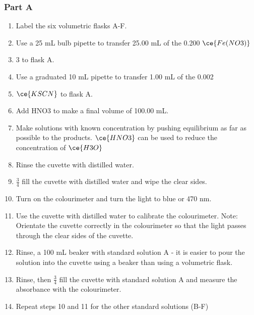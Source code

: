 	\subsubsection{Part A}
		\begin{enumerate}
			\item Label the six volumetric flasks A-F.
			\item Use a 25 mL bulb pipette to transfer 25.00 mL of the 0.200 \unit{\moLar} $\ce{Fe(NO3)}$\item 3 to flask A.
			\item Use a graduated 10 mL pipette to transfer 1.00 mL of the 0.002 \unit{\moLar} \item $\ce{KSCN}$ to flask A.
			\item Add HNO3 to make a final volume of 100.00 mL.
			\item Make solutions with known concentration by pushing equilibrium as far as possible to the products. $\ce{HNO3}$ can be used to reduce the concentration of $\ce{H3O}$
			\item Rinse the cuvette with distilled water.
			\item $\frac{3}{4}$ fill the cuvette with distilled water and wipe the clear sides. 
			\item Turn on the colourimeter and turn the light to blue or 470 nm.
			\item Use the cuvette with distilled water to calibrate the colourimeter. Note: Orientate the cuvette correctly in the colourimeter so that the light passes through the clear sides of the cuvette.
			\item Rinse, a 100 mL beaker with standard solution A - it is easier to pour the solution into the cuvette using a beaker than using a volumetric flask.
			\item Rinse, then $\frac{3}{4}$ fill the cuvette with standard solution A and measure the absorbance with the colourimeter.
			\item Repeat steps 10 and 11 for the other standard solutions (B-F)
		\end{enumerate}
	